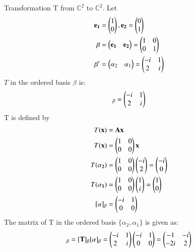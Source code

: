 Transformation T from $\mathbb{C}^{2}$ to $\mathbb{C}^{2}$. Let
\begin{align}
    \mathbf{e_1}&=\begin{pmatrix}1\\0\end{pmatrix},\mathbf{e_2}=\begin{pmatrix}0\\1\end{pmatrix}\\
        \mathbf{\beta} &= \begin{pmatrix}\mathbf{e_1} & \mathbf{e_2}\end{pmatrix}=\begin{pmatrix}1&0\\0&1\end{pmatrix}\\
\mathbf{\beta}^\prime&=\begin{pmatrix}\alpha_2 & \alpha_1\end{pmatrix}=\begin{pmatrix}-i&1\\2&i\end{pmatrix}
\end{align}
$T$ in the ordered basis $\beta$ is:
\begin{align}
[\vec{T}]_\beta=\myvec{-i&1\\2&i}
\end{align}
T is defined by
\begin{align}
   T(\mathbf{x})&= \mathbf{A}\mathbf{x}\\
    T(\mathbf{x})&=\begin{pmatrix}1&0\\0&0\end{pmatrix}\mathbf{x}\\
        T(\mathbf{\alpha_2})&=\begin{pmatrix}1&0\\0&0\end{pmatrix}\begin{pmatrix}-i\\2\end{pmatrix}=\begin{pmatrix}-i\\0\end{pmatrix}\\
    T(\mathbf{\alpha_1})&=\begin{pmatrix}1&0\\0&0\end{pmatrix}\begin{pmatrix}1\\i\end{pmatrix}=\begin{pmatrix}1\\0\end{pmatrix}\\
    [\alpha]_\beta&=\begin{pmatrix}-i&1\\0&0\end{pmatrix}
\end{align}
The matrix of T in the ordered basis $\{\alpha_2,\alpha_1\}$ is given as:
\begin{align}
[\vec{T}_\alpha]_\beta=[\vec{T}]_\beta[\alpha]_\beta=\myvec{-i&1\\2&i}\myvec{-i&1\\0&0}=\myvec{-1&-i\\-2i&2}
\end{align}
